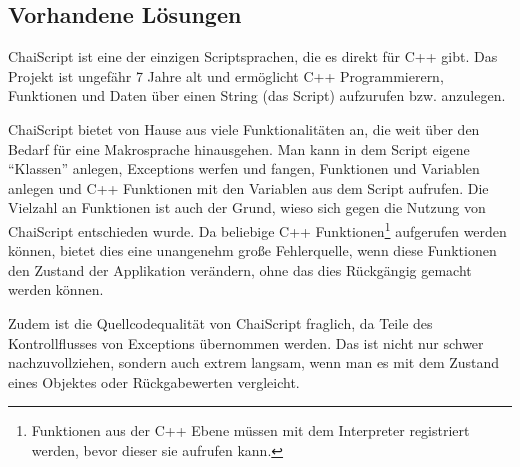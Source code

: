   \subsection{Vorhandene Lösungen}
  \label{ssec:Vorhandene Lösungen}
    ChaiScript \autocite{chai-script} ist eine der einzigen Scriptsprachen, die es direkt für C++ gibt. Das Projekt ist ungefähr 7 Jahre alt und ermöglicht C++ Programmierern, Funktionen und Daten über einen String (das Script) aufzurufen bzw. anzulegen.

    ChaiScript bietet von Hause aus viele Funktionalitäten an, die weit über den Bedarf für eine Makrosprache hinausgehen. Man kann in dem Script eigene ``Klassen'' anlegen, Exceptions werfen und fangen, Funktionen und Variablen anlegen und C++ Funktionen mit den Variablen aus dem Script aufrufen. Die Vielzahl an Funktionen ist auch der Grund, wieso sich gegen die Nutzung von ChaiScript entschieden wurde. Da beliebige C++ Funktionen\footnote{
      Funktionen aus der C++ Ebene müssen mit dem Interpreter registriert werden, bevor dieser sie aufrufen kann.
    } aufgerufen werden können, bietet dies eine unangenehm große Fehlerquelle, wenn diese Funktionen den Zustand der Applikation verändern, ohne das dies Rückgängig gemacht werden können.

    Zudem ist die Quellcodequalität von ChaiScript fraglich, da Teile des Kontrollflusses von Exceptions übernommen werden. Das ist nicht nur schwer nachzuvollziehen, sondern auch extrem langsam, wenn man es mit dem Zustand eines Objektes oder Rückgabewerten vergleicht.

